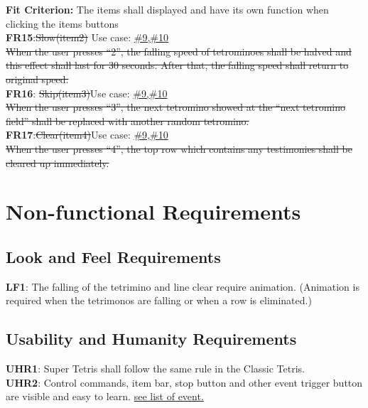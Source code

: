 \documentclass[12pt, titlepage]{article}
\begin{document}
\textbf{Fit Criterion:} {\color{red}    The items shall displayed and have its own function when clicking the items buttons} \\
\newline
\textbf{FR15}:\st{Slow(item2)} \tab Use case: \hyperref[event:usesitem]{\#9,\#10}  \\
\st{When the user presses “2”, the falling speed of tetrominoes shall be halved and this effect shall last for 30 seconds. After that, the falling speed shall return to original speed.} \\
\newline
\textbf{FR16}: \st{Skip(item3)}\tab Use case: \hyperref[event:usesitem]{\#9,\#10} \\
\st{When the user presses “3”, the next tetromino showed at the “next tetromino field” shall be replaced with another random tetromino.}\\
\newline
\textbf{FR17}:\st{Clear(item4)}\tab Use case: \hyperref[event:usesitem]{\#9,\#10} \\
\st{When the user presses “4”, the top row which contains any testimonies shall be cleared up immediately.}\\

\newpage
\section{Non-functional Requirements}

\subsection{Look and Feel Requirements}
\textbf{LF1}: The falling of the tetrimino and line clear require animation. (Animation is required when the tetrimonos are falling or when a row is eliminated.)

\subsection{Usability and Humanity Requirements}

\textbf{UHR1}: Super Tetris shall follow the same rule in the Classic Tetris.\\ 
\newline
\textbf{UHR2}: Control commands, item bar, stop button and other event trigger button are visible and easy to learn. \hyperref[listofevent]{see list of event.} \\
\end{document}
